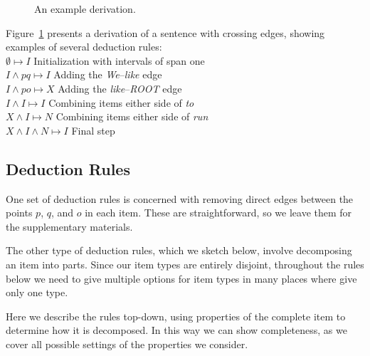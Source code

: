 \begin{figure}
\centering

\vspace{-10mm}
\caption{\label{fig:alg-example}
An example derivation.
}
\end{figure}

Figure~\ref{fig:alg-example} presents a derivation of a sentence with crossing edges, showing examples of several deduction rules: \\
$\emptyset \mapsto I$ \hfill Initialization with intervals of span one \\
$I \land pq \mapsto I$ \hfill Adding the \emph{We}--\emph{like} edge\\
$I \land po \mapsto X$ \hfill Adding the \emph{like}--\emph{ROOT} edge \\
$I \land I \mapsto I$ \hfill Combining items either side of \emph{to} \\
$X \land I \mapsto N$ \hfill Combining items either side of \emph{run} \\
$X \land I \land N \mapsto I$ \hfill Final step

\subsection{Deduction Rules}
One set of deduction rules is concerned with removing direct edges between the points $p$, $q$, and $o$ in each item.
These are straightforward, so we leave them for the supplementary materials.

The other type of deduction rules, which we sketch below, involve decomposing an item into parts.
Since our item types are entirely disjoint, throughout the rules below we need to give multiple options for item types in many places where \textcite{ec} give only one type.

Here we describe the rules top-down, using properties of the complete item to determine how it is decomposed.
In this way we can show completeness, as we cover all possible settings of the properties we consider.

